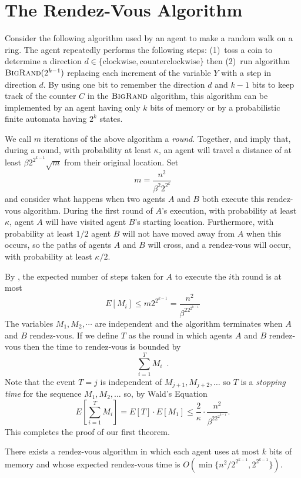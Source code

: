 \documentclass[lotsofwhite]{patmorin}
\newcommand{\bigrand}{\textsc{BigRand}}
\begin{document}
\section{The Rendez-Vous Algorithm}

Consider the following algorithm used by an agent to make a random
walk on a ring.  The agent repeatedly performs the following steps:
(1)~toss a coin to determine a direction
$d\in\{\mbox{clockwise},\mbox{counterclockwise}\}$ then (2)~run
algorithm $\bigrand(2^{k-1})$ replacing each increment of the variable
$Y$ with a step in direction $d$. By using one bit to remember the
direction $d$ and $k-1$ bits to keep track of the counter $C$ in the
$\bigrand$ algorithm, this algorithm can be implemented by an agent
having only $k$ bits of memory or by a probabilistic finite automata
having $2^{k}$ states.

We call $m$ iterations of the above algorithm a \emph{round}.
Together,  and  imply that, during a
round, with probability at least $\kappa$, an agent will travel a
distance of at least $\beta 2^{2^{k-1}}\sqrt{m}$ from their original
location.  Set
\[
   m= \frac{n^2}{\beta^2 2^{2^k}}  
\]
and consider what happens when two agents $A$ and $B$ both execute
this rendez-vous algorithm.  During the first round of $A$'s
execution, with probability at least $\kappa$, agent $A$ will have
visited agent $B$'s starting location. Furthermore, with probability
at least $1/2$ agent $B$ will not have moved away from $A$ when this
occurs, so the paths of agents $A$ and $B$ will cross, and a
rendez-vous will occur, with probability at least $\kappa/2$.

By , the expected number of steps taken for $A$ to
execute the $i$th round is at most
\[
    E[M_i] \le m 2^{2^{k-1}} = \frac{n^2}{\beta^22^{2^{k-1}}}
\]
The variables $M_1,M_2,\cdots$ are independent and the algorithm
terminates when $A$ and $B$ rendez-vous.  If we define $T$ as
the round in which agents $A$ and $B$ rendez-vous then the time to
rendez-vous is bounded by
\[
   \sum_{i=1}^T M_i \enspace .
\]
Note that the event $T=j$ is independent of $M_{j+1},M_{j+2},\ldots$
so $T$ is a \emph{stopping time} \cite{mXX} for the sequence
$M_1,M_2,\ldots$ so, by Wald's Equation
\[
   E\left[\sum_{i=1}^T M_i\right] = E[T]\cdot E[M_1] \le
\frac{2}{\kappa}\cdot \frac{n^2}{\beta^22^{2^{k-1}}}.
\]
This completes the proof of our first theorem.
\begin{thm}
There exists a rendez-vous algorithm in which each agent uses at most
$k$ bits of memory and whose expected rendez-vous time is
$O(\min\{n^2/2^{2^{k-1}},2^{2^{k-1}}\})$.
\end{thm}
\end{document}
